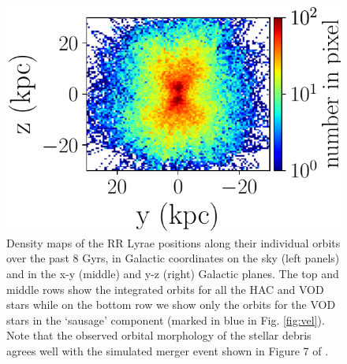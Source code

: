 \documentclass[fleqn,usenatbib]{mnras}
\begin{document}
\begin{figure}
             \includegraphics[scale=0.302]{VOD_orbits_8Gyrs_yz_sausage.pdf}
\vspace{-0.45cm}
   \caption{Density maps of the RR Lyrae positions along their
     individual orbits over the past 8 Gyrs, in Galactic coordinates
     on the sky (left panels) and in the x-y (middle) and y-z (right) Galactic
     planes.  The top and middle rows show the integrated orbits for
     all the HAC and VOD stars while on the bottom row we show only
     the orbits for the VOD stars in the `sausage' component (marked
     in blue in Fig. \ref{fig:vel}). Note that the observed orbital
     morphology of the stellar debris agrees well with the simulated
     merger event shown in Figure 7 of \citet{Simion2018}.}
    \label{fig:backorbits}
\end{figure}
%
%
\end{document}
